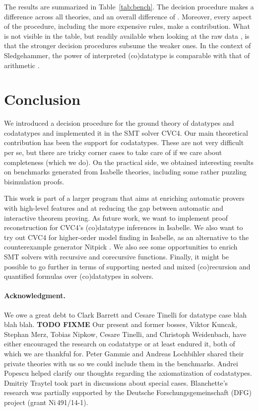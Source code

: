 The results are summarized in Table~\ref{tab:bench}. The decision procedure
makes a difference across all theories, and an overall difference of
. Moreover, every aspect of the procedure, including the more
expensive rules, make a contribution. What is not visible in the table, but
readily available when looking at the raw data \cite{our-eval-data}, is that
the stronger decision procedures subsume the weaker ones. In the context of
Sledgehammer, the power of interpreted (co)datatype is comparable with that of
arithmetic \cite{blanchette-et-al-2013-smt}.


\section{Conclusion}
\label{sec:conclusion}

We introduced a decision procedure for the ground theory of datatypes and
codatatypes and implemented it in the SMT solver CVC4. Our main theoretical
contribution has been the support for codatatypes. These are not very
difficult per se, but there are tricky corner cases to take care of if we care
about completeness (which we do).
On the practical side, we obtained
interesting results on benchmarks generated from Isabelle theories, including
some rather
puzzling bisimulation proofs.

This work is part of a larger program that aims at enriching automatic provers
with high-level features and at reducing the gap between automatic and
interactive theorem proving. As future work, we want to implement proof
reconstruction for CVC4's (co)datatype inferences in Isabelle. We also want to
try out CVC4 for higher-order model finding in Isabelle, as an alternative to
the counterexample generator Nitpick \cite{blanchette-nipkow-2010}. We also
see some opportunities to enrich SMT solvers with recursive and corecursive
functions. Finally, it might be possible to go further in terms of supporting
nested and mixed (co)recursion and quantified formulas over (co)datatypes in
solvers.

\def\ackname{Acknowledgment}
\paragraph{\ackname.}
We owe a great debt to Clark Barrett and Cesare Tinelli for datatype case blah
blah blah. \textbf{TODO FIXME}
%
Our present and former bosses, Viktor Kuncak, Stephan Merz, Tobias Nipkow,
Cesare Tinelli, and Christoph Weidenbach, have either encouraged the research on
codatatype or at least endured
it, both of which we are thankful for.
%
Peter Gammie and Andreas Lochbihler shared their private
theories with us so we could include them in the benchmarks.
Andrei Popescu helped clarify our thoughts regarding the axiomatization of
codatatypes. Dmitriy Traytel took part in discussions about special
cases.
%
Blanchette's research was partially supported by the Deutsche
Forschungs\-gemein\-schaft (DFG) project
 (grant Ni\,491\slash 14-1).


{}


